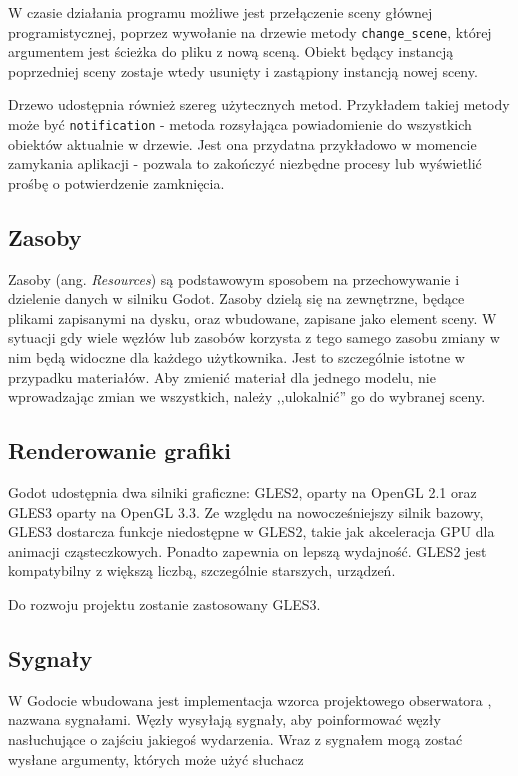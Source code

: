 W czasie działania programu możliwe jest przełączenie sceny głównej programistycznej, poprzez wywołanie na drzewie metody \texttt{change\_scene}, której argumentem jest ścieżka do pliku z nową sceną. Obiekt będący instancją poprzedniej sceny zostaje wtedy usunięty i zastąpiony instancją nowej sceny.

Drzewo udostępnia również szereg użytecznych metod. Przykładem takiej metody może być \texttt{notification} - metoda rozsyłająca powiadomienie do wszystkich obiektów aktualnie w drzewie. Jest ona przydatna przykładowo w momencie zamykania aplikacji - pozwala to zakończyć niezbędne procesy lub wyświetlić prośbę o potwierdzenie zamknięcia.

\subsection{Zasoby}
Zasoby (ang. \emph{Resources}) są podstawowym sposobem na przechowywanie i dzielenie danych w silniku Godot. Zasoby dzielą się na zewnętrzne, będące plikami zapisanymi na dysku, oraz wbudowane, zapisane jako element sceny. W sytuacji gdy wiele węzłów lub zasobów korzysta z tego samego zasobu zmiany w nim będą widoczne dla każdego użytkownika. Jest to szczególnie istotne w przypadku materiałów. Aby zmienić materiał dla jednego modelu, nie wprowadzając zmian we wszystkich, należy ,,ulokalnić'' go do wybranej sceny. 

\subsection{Renderowanie grafiki}
Godot udostępnia dwa silniki graficzne: GLES2, oparty na OpenGL 2.1 oraz GLES3 oparty na OpenGL 3.3. Ze względu na nowocześniejszy silnik bazowy, GLES3 dostarcza funkcje niedostępne w GLES2, takie jak akceleracja GPU dla animacji cząsteczkowych. Ponadto zapewnia on lepszą wydajność. GLES2 jest kompatybilny z większą liczbą, szczególnie starszych, urządzeń.

Do rozwoju projektu zostanie zastosowany GLES3.

\subsection{Sygnały}
W Godocie wbudowana jest implementacja wzorca projektowego obserwatora \cite{game_programming_patterns}, nazwana sygnałami. Węzły wysyłają sygnały, aby poinformować węzły nasłuchujące o zajściu jakiegoś wydarzenia. Wraz z sygnałem mogą zostać wysłane argumenty, których może użyć słuchacz

